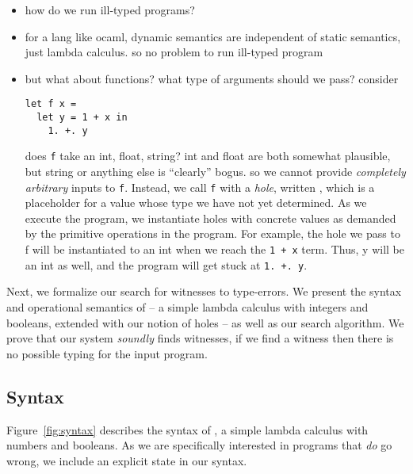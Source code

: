 
\begin{itemize}
\item how do we run ill-typed programs?
\item for a lang like ocaml, dynamic semantics are independent of static
  semantics, just lambda calculus. so no problem to run ill-typed
  program
\item but what about functions? what type of arguments should we pass? consider

\begin{lstlisting}
let f x = 
  let y = 1 + x in
    1. +. y
\end{lstlisting}

does \texttt{f} take an int, float, string? int and float are both
somewhat plausible, but string or anything else is ``clearly'' bogus. so
we cannot provide \emph{completely arbitrary} inputs to
\texttt{f}. Instead, we call \texttt{f} with a \emph{hole}, written
\ehole{}, which is a placeholder for a value whose type we have not
yet determined. As we execute the program, we instantiate holes with
concrete values as demanded by the primitive operations in the
program. For example, the hole we pass to f will be instantiated to an
int when we reach the \lstinline{1 + x} term. Thus, y will be an int as
well, and the program will get stuck at \lstinline{1. +. y}. 

\end{itemize}

Next, we formalize our search for witnesses to type-errors. We present
the syntax and operational semantics of \lang -- a simple lambda calculus with
integers and booleans, extended with our notion of holes -- as well as our
search algorithm. We prove that our system \emph{soundly} finds
witnesses, \ie if we find a witness then there is no possible typing for
the input program.

\subsection{Syntax}
\label{sec:syntax}


Figure~\ref{fig:syntax} describes the syntax of \lang, a simple lambda
calculus with numbers and booleans. As we are specifically interested in
programs that \emph{do} go wrong, we include an explicit \stuck state in
our syntax.

